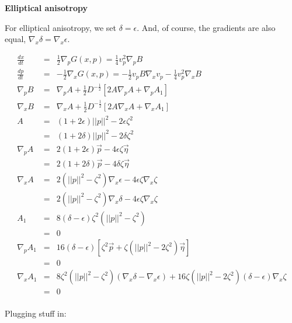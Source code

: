 \documentclass[12pt]{article}
\begin{document}
\textbf{Elliptical anisotropy}

For elliptical anisotropy, we set $\delta = \epsilon$. And, of course, the gradients are also equal, $\nabla_x \delta = \nabla_x \epsilon$.

\begin{eqnarray}
\frac{dx}{dt}   &=&  \frac{1}{2}\nabla_p G(x,p) =  \frac{1}{4}v_p^2\nabla_pB\\
\frac{dp}{dt}   &=& -\frac{1}{2}\nabla_x G(x,p) = -\frac{1}{2}v_pB\nabla_xv_p-\frac{1}{4}v_p^2\nabla_xB\\
\nabla_p B      &=&  \nabla_p A+\frac{1}{2}D^{-\frac{1}{2}}\left[2A\nabla_p A + \nabla_p A_1\right]\\
\nabla_x B      &=&  \nabla_x A+\frac{1}{2}D^{-\frac{1}{2}}\left[2A\nabla_x A + \nabla_x A_1\right]\\
A               &=&  (1+2\epsilon)||p||^2-2\epsilon\zeta^2 \\
                &=&  (1+2\delta)||p||^2-2\delta\zeta^2 \\
\nabla_p A      &=&  2(1+2\epsilon)\vec{p}-4\epsilon\zeta\vec{\eta}\\
                &=&  2(1+2\delta)\vec{p}-4\delta\zeta\vec{\eta}\\
\nabla_x A      &=&  2(||p||^2-\zeta^2)\nabla_x \epsilon - 4\epsilon\zeta\nabla_x \zeta\\
                &=&  2(||p||^2-\zeta^2)\nabla_x \delta - 4\epsilon\zeta\nabla_x \zeta\\
A_1             &=&  8(\delta-\epsilon)\zeta^2(||p||^2-\zeta^2) \\
                &=&  0 \\
\nabla_p A_1    &=&  16(\delta-\epsilon)\left[\zeta^2\vec{p}+\zeta(||p||^2-2\zeta^2)\vec{\eta}\right]\\
                &=&  0\\
\nabla_x A_1    &=&  8\zeta^2(||p||^2-\zeta^2)(\nabla_x \delta - \nabla_x \epsilon) + 16\zeta(||p||^2-2\zeta^2)(\delta-\epsilon)\nabla_x \zeta \nonumber\\
                &=&  0\\
\end{eqnarray}

Plugging stuff in:
\end{document}
